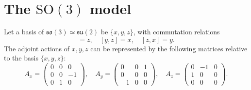 \documentclass[a4paper]{article}
\newcommand{\SO}{\mathrm{SO}}
\newcommand{\su}{\mathfrak{su}}
\newcommand{\so}{\mathfrak{so}}
\theoremstyle{definition}
\begin{document}
\section{The $\SO(3)$ model}\label{sec:so_3}


Let a basis of $\so(3) \simeq \su(2)$ be $\{x,y,z\}$, with commutation relations
\begin{equation*}
    [x,y] = z, \quad  [y,z]=x, \quad [z,x] = y. 
\end{equation*}
The adjoint actions of $x,y,z$ can be represented by the following matrices relative to the basis $\{x,y,z\}$:
\begin{equation*}
    A_x = \begin{pmatrix}
         0 & 0 & 0 \\ 
         0 & 0 & -1 \\
         0 & 1 & 0
    \end{pmatrix}, \quad 
    A_y = \begin{pmatrix}
         0 & 0 & 1 \\ 
         0 & 0 & 0 \\
         -1 & 0 & 0
    \end{pmatrix}, \quad 
    A_z = \begin{pmatrix}
         0 & -1 & 0 \\ 
         1 & 0 & 0 \\
         0 & 0 & 0
    \end{pmatrix}. 
\end{equation*}
\end{document}
